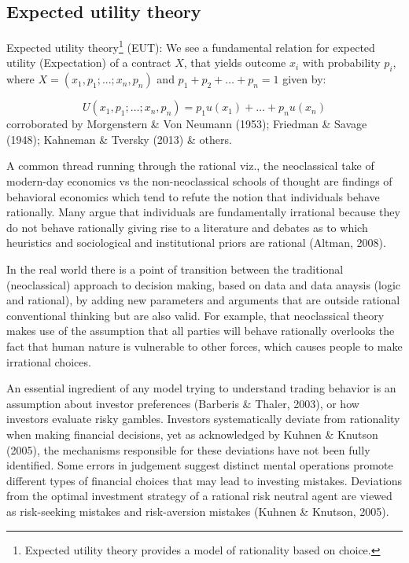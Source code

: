 \documentclass{DissertateUSU}
\begin{document}
\subsection{Expected utility theory}
\label{ssec:Expected utility theory}

Expected utility
theory\footnote{Expected utility theory provides a model of rationality based on choice.}
(EUT): We see a fundamental relation for expected utility (Expectation)
of a contract \(X\), that yields outcome \(x_i\) with probability
\(p_i\), where \(X = (x_1,p_1; ...; x_n,p_n)\) and
\(p_1+p_2+\ldots+p_n=1\) given by:

\singlespacing

\begin{equation}\label{EUT_extended}
U(x_1,p_1;\ldots;x_n,p_n) = p_1u(x_1)+\ldots+p_nu(x_n) 
\end{equation} \doublespacing corroborated by Morgenstern \& Von Neumann
(1953); Friedman \& Savage (1948); Kahneman \& Tversky (2013) \& others.

A common thread running through the rational viz., the neoclassical take
of modern-day economics vs the non-neoclassical schools of thought are
findings of behavioral economics which tend to refute the notion that
individuals behave rationally. Many argue that individuals are
fundamentally irrational because they do not behave rationally giving
rise to a literature and debates as to which heuristics and sociological
and institutional priors are rational (Altman, 2008).\medskip

In the real world there is a point of transition between the traditional
(neoclassical) approach to decision making, based on data and data
anaysis (logic and rational), by adding new parameters and arguments
that are outside rational conventional thinking but are also valid. For
example, that neoclassical theory makes use of the assumption that all
parties will behave rationally overlooks the fact that human nature is
vulnerable to other forces, which causes people to make irrational
choices.\medskip 

An essential ingredient of any model trying to understand trading
behavior is an assumption about investor preferences (Barberis \&
Thaler, 2003), or how investors evaluate risky gambles. Investors
systematically deviate from rationality when making financial decisions,
yet as acknowledged by Kuhnen \& Knutson (2005), the mechanisms
responsible for these deviations have not been fully identified. Some
errors in judgement suggest distinct mental operations promote different
types of financial choices that may lead to investing mistakes.
Deviations from the optimal investment strategy of a rational risk
neutral agent are viewed as risk-seeking mistakes and risk-aversion
mistakes (Kuhnen \& Knutson, 2005).\medskip 
\end{document}
